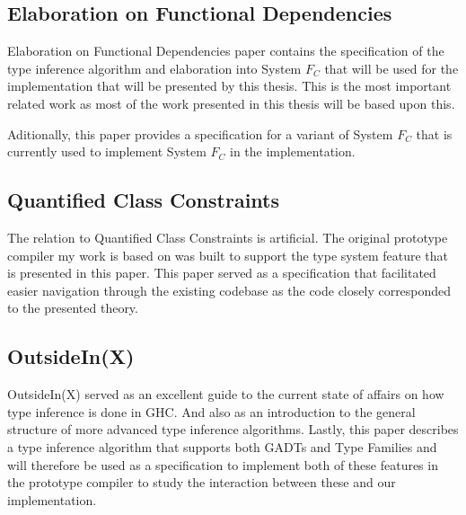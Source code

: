 \subsection{Elaboration on Functional Dependencies}

Elaboration on Functional
Dependencies\cite{Karachalias:2017:EFD:3156695.3122966} paper contains the
specification of the type inference algorithm and elaboration into System $F_C$
that will be used for the implementation that will be presented by this thesis.
This is the most important related work as most of the work presented in this
thesis will be based upon this.

Aditionally, this paper provides a specification for a variant of System $F_C$
that is currently used to implement System $F_C$ in the implementation.

\subsection{Quantified Class Constraints}

The relation to Quantified Class
Constraints\cite{Bottu:2017:QCC:3156695.3122967} is artificial. The original
prototype compiler my work is based on was built to support the type system
feature that is presented in this paper. This paper served as a specification
that facilitated easier navigation through the existing codebase as the code
closely corresponded to the presented theory.

\subsection{OutsideIn(X)}

OutsideIn(X)\cite{outsideinx-modular-type-inference-with-local-assumptions}
served as an excellent guide to the current state of affairs on how type
inference is done in GHC. And also as an introduction to the general structure
of more advanced type inference algorithms. Lastly, this paper describes a type
inference algorithm that supports both GADTs and Type Families and will
therefore be used as a specification to implement both of these features in the
prototype compiler to study the interaction between these and our
implementation.
